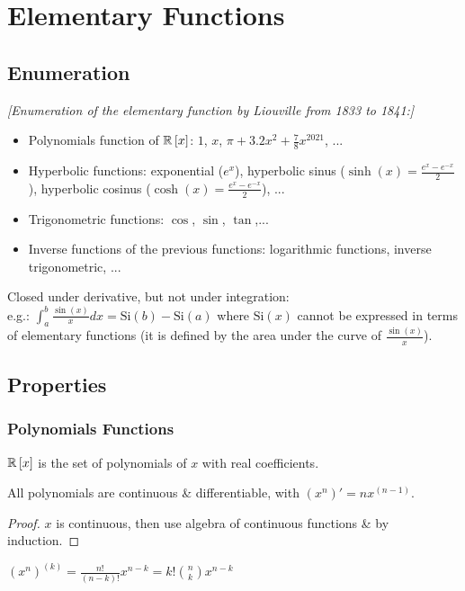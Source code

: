 \chapter{Elementary Functions}

\section{Enumeration}
\textit{[Enumeration of the elementary function by Liouville from
1833 to 1841:]}

\begin{itemize}
	\item Polynomials function of $\mathbb{R}\left[ x \right]$: $1$, $x$, $\pi + 3.2x^2+ \frac{7}{8}x^{2021}$, ...
	\item Hyperbolic functions: exponential ($e^x$), hyperbolic sinus ($\sinh(x) = \frac{e^x - e^{-x}}{2}$), hyperbolic cosinus ($\cosh(x) = \frac{e^x - e^{-x}}{2}$), ...
	\item Trigonometric functions: $\cos$, $\sin$, $\tan$,...
	\item Inverse functions of the previous functions: logarithmic functions, inverse
	trigonometric, ...
\end{itemize}

Closed under derivative, but not under integration:\\
e.g.: $\int_{a}^{b} \frac{\sin(x)}{x}dx = \text{Si}(b) - \text{Si}(a)$ where $\text{Si}(x)$ cannot be expressed in terms of elementary functions (it is defined by the area under the curve of $\frac{\sin(x)}{x}$).

\section{Properties}
\subsection{Polynomials Functions}
\begin{definition}
	$\mathbb{R} \left[ x \right]$ is the set of polynomials of $x$ with real coefficients.
\end{definition}
\begin{property}
	All polynomials are continuous \& differentiable, with $(x^n)' = nx^{(n-1)}$.
\end{property}
\begin{proof}
	$x$ is continuous, then use algebra of continuous functions \& by induction.
\end{proof}
\begin{corollary}
	$\left( x^n \right)^{(k)} = \frac{n!}{(n-k)!}x^{n-k} = k! \binom{n}{k} x^{n-k}$
\end{corollary}

